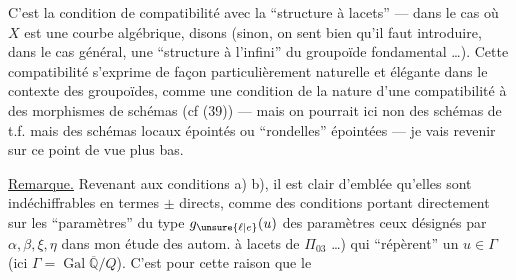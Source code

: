 C'est la condition de compatibilité avec la ``structure à lacets'' --- dans le cas où $X$ est une courbe algébrique, disons (sinon, on sent bien qu'il faut introduire, dans le cas général, une ``structure à l'infini'' du groupoïde fondamental \ldots). \margin{$\Vert$} Cette compatibilité  s'exprime de façon particulièrement naturelle et élégante dans le contexte des groupoïdes, \unsure{$\{$} comme une condition de la nature d'une compatibilité à des morphismes de schémas (cf (39)) --- mais on pourrait ici non des schémas de t.f. mais des schémas locaux épointés ou ``rondelles'' épointées --- je vais revenir sur ce point de vue plus bas.

\uline{Remarque.} Revenant aux conditions a) b), il est clair d'emblée qu'elles sont indéchiffrables  en termes $\pm$ directs, comme des conditions portant directement sur les ``paramètres'' du type $g_{\unsure{\ell|e}}(u)$ \unsure{$\{$|(}des paramètres   ceux désignés par $\alpha,\beta,\xi,\eta$ dans mon étude des autom. à lacets de $\Pi_{03}$ \ldots) qui ``répèrent'' un $u\in\Gamma$ (ici $\Gamma=\operatorname{Gal}\overline{\mathbb{Q}}/Q$).  C'est pour cette raison que le
